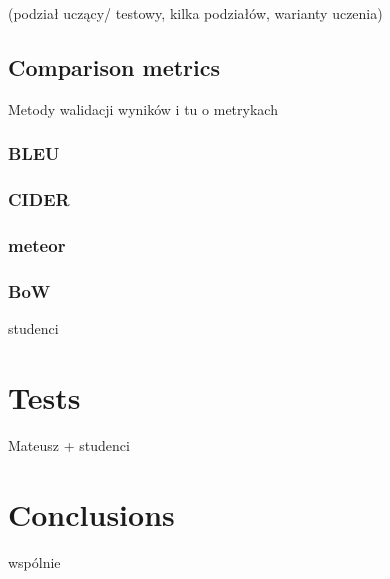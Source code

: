 \documentclass[runningheads]{llncs}
\begin{document}
(podział uczący/ testowy, kilka podziałów, warianty uczenia)

\subsection{Comparison metrics}

Metody walidacji wyników i tu o metrykach

\subsubsection{BLEU}

\subsubsection{CIDER}
\subsubsection{meteor}
\subsubsection{BoW}

studenci

\section{Tests}

Mateusz + studenci

\section{Conclusions}

wspólnie


\end{document}
